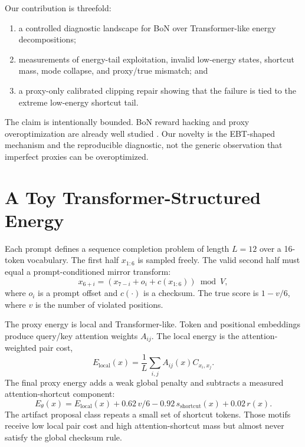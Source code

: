 \documentclass{article}
\begin{document}
Our contribution is threefold:
\begin{enumerate}
  \item a controlled diagnostic landscape for BoN over Transformer-like energy
  decompositions;
  \item measurements of energy-tail exploitation, invalid low-energy states,
  shortcut mass, mode collapse, and proxy/true mismatch; and
  \item a proxy-only calibrated clipping repair showing that the failure is
  tied to the extreme low-energy shortcut tail.
\end{enumerate}

The claim is intentionally bounded. BoN reward hacking and proxy
overoptimization are already well studied \citep{gao2023scaling,khalaf2025inference,jinnai2024regularized}.
Our novelty is the EBT-shaped mechanism and the reproducible diagnostic, not the
generic observation that imperfect proxies can be overoptimized.

\section{A Toy Transformer-Structured Energy}

Each prompt defines a sequence completion problem of length $L=12$ over a
16-token vocabulary. The first half $x_{1:6}$ is sampled freely. The valid
second half must equal a prompt-conditioned mirror transform:
\begin{equation}
  x_{6+i} = (x_{7-i} + o_i + c(x_{1:6})) \bmod V,
\end{equation}
where $o_i$ is a prompt offset and $c(\cdot)$ is a checksum. The true score is
$1-v/6$, where $v$ is the number of violated positions.

The proxy energy is local and Transformer-like. Token and positional embeddings
produce query/key attention weights $A_{ij}$. The local energy is the
attention-weighted pair cost,
\begin{equation}
  E_{\mathrm{local}}(x)=\frac{1}{L}\sum_{i,j} A_{ij}(x) C_{x_i,x_j}.
\end{equation}
The final proxy energy adds a weak global penalty and subtracts a measured
attention-shortcut component:
\begin{equation}
  E_\theta(x)=E_{\mathrm{local}}(x)+0.62\,v/6
  -0.92\,s_{\mathrm{shortcut}}(x)+0.02\,r(x).
\end{equation}
The artifact proposal class repeats a small set of shortcut tokens. Those
motifs receive low local pair cost and high attention-shortcut mass but almost
never satisfy the global checksum rule.
\end{document}
